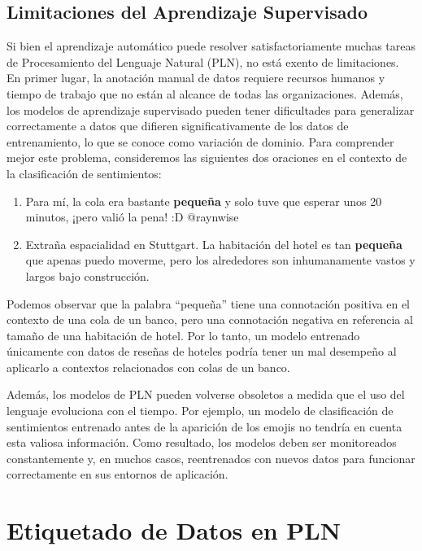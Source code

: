 \subsection{Limitaciones del Aprendizaje Supervisado}

Si bien el aprendizaje automático puede resolver satisfactoriamente muchas tareas de Procesamiento del Lenguaje Natural (PLN), no está exento de limitaciones. En primer lugar, la anotación manual de datos requiere recursos humanos y tiempo de trabajo que no están al alcance de todas las organizaciones. Además, los modelos de aprendizaje supervisado pueden tener dificultades para generalizar correctamente a datos que difieren significativamente de los datos de entrenamiento, lo que se conoce como variación de dominio. Para comprender mejor este problema, consideremos las siguientes dos oraciones en el contexto de la clasificación de sentimientos:

\begin{enumerate}
   \item Para mí, la cola era bastante \textcolor[rgb]{0.00,0.00,1.00}{\textbf{pequeña}} y solo tuve que esperar unos 20 minutos, ¡pero valió la pena! :D @raynwise
   \item Extraña espacialidad en Stuttgart. La habitación del hotel es tan \textcolor[rgb]{1.00,0.00,0.00}{\textbf{pequeña}} que apenas puedo moverme, pero los alrededores son inhumanamente vastos y largos bajo construcción.
\end{enumerate}

Podemos observar que la palabra ``pequeña'' tiene una connotación positiva en el contexto de una cola de un banco, pero una connotación negativa en referencia al tamaño de una habitación de hotel. Por lo tanto, un modelo entrenado únicamente con datos de reseñas de hoteles podría tener un mal desempeño al aplicarlo a contextos relacionados con colas de un banco.

Además, los modelos de PLN pueden volverse obsoletos a medida que el uso del lenguaje evoluciona con el tiempo. Por ejemplo, un modelo de clasificación de sentimientos entrenado antes de la aparición de los emojis no tendría en cuenta esta valiosa información. Como resultado, los modelos deben ser monitoreados constantemente y, en muchos casos, reentrenados con nuevos datos para funcionar correctamente en sus entornos de aplicación.

\section{Etiquetado de Datos en PLN}

